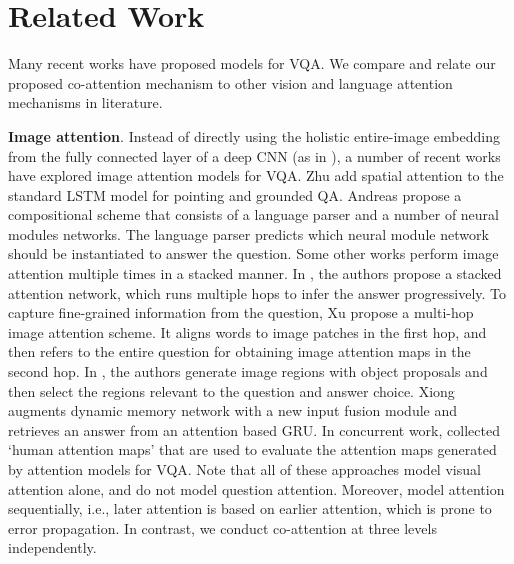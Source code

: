 \documentclass{article}
\begin{document}
 \section{Related Work}
\label{sec:related}
Many recent works \cite{antol2015vqa, gao2015you, krishna2016visual, malinowski2015ask, ren2015exploring, zhang2015yin, kim2016multimodal, fukui2016multimodal} have proposed models for VQA. We compare and relate our proposed co-attention mechanism to other vision and language attention mechanisms in literature. 

\textbf{Image attention}. Instead of directly using the holistic entire-image embedding from the fully connected layer of a deep CNN (as in \cite{antol2015vqa, ma2015learning, malinowski2015ask, ren2015exploring}), a number of recent works have explored image attention models for VQA. Zhu \etal \cite{zhu2015visual7w} add spatial attention to the standard LSTM model for pointing and grounded QA. Andreas \etal \cite{andreas2015deep} propose a compositional scheme that consists of a language parser and a number of neural modules networks. The language parser predicts which neural module network should be instantiated to answer the question. 
Some other works perform image attention multiple times in a stacked manner. In \cite{yang2015stacked}, the authors propose a stacked attention network, which runs multiple hops to infer the answer progressively. To capture fine-grained information from the question, Xu \etal \cite{xu2015ask} propose a multi-hop image attention scheme. It aligns words to image patches in the first hop, and then refers to the entire question for obtaining image attention maps in the second hop. In \cite{shih2015look}, the authors generate image regions with object proposals and then select the regions relevant to the question and answer choice. Xiong~\etal \cite{xiong2016dynamic} augments dynamic memory network with a new input fusion module and retrieves an answer from an attention based GRU. In concurrent work, \cite{das2016human} collected `human attention maps' that are used to evaluate the attention maps generated by attention models for VQA. Note that all of these approaches model visual attention alone, and do not model question attention. Moreover, \cite{xu2015ask, yang2015stacked} model attention sequentially, i.e., later attention is based on earlier attention, which is prone to error propagation. In contrast, we conduct co-attention at three levels independently.
\end{document}
